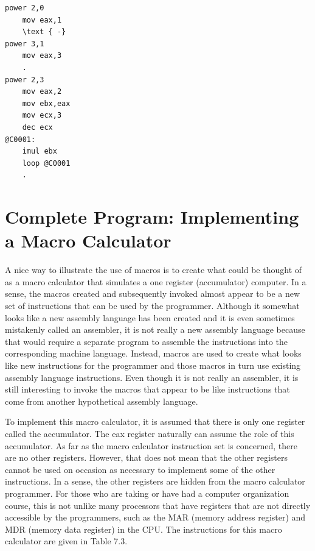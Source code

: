 \documentclass[10pt]{book}
\begin{document}
\begin{verbatim}
power 2,0
    mov eax,1
    \text { -}
power 3,1
    mov eax,3
    .
power 2,3
    mov eax,2
    mov ebx,eax
    mov ecx,3
    dec ecx
@C0001:
    imul ebx
    loop @C0001
    .
\end{verbatim}

\section{Complete Program: Implementing a Macro Calculator}
A nice way to illustrate the use of macros is to create what could be thought of as a macro calculator that simulates a one register (accumulator) computer. In a sense, the macros created and subsequently invoked almost appear to be a new set of instructions that can be used by the programmer. Although it somewhat looks like a new assembly language has been created and it is even sometimes mistakenly called an assembler, it is not really a new assembly language because that would require a separate program to assemble the instructions into the corresponding machine language. Instead, macros are used to create what looks like new instructions for the programmer and those macros in turn use existing assembly language instructions. Even though it is not really an assembler, it is still interesting to invoke the macros that appear to be like instructions that come from another hypothetical assembly language.

To implement this macro calculator, it is assumed that there is only one register called the accumulator. The eax register naturally can assume the role of this accumulator. As far as the macro calculator instruction set is concerned, there are no other registers. However, that does not mean that the other registers cannot be used on occasion as necessary to implement some of the other instructions. In a sense, the other registers are hidden from the macro calculator programmer. For those who are taking or have had a computer organization course, this is not unlike many processors that have registers that are not directly accessible by the programmers, such as the MAR (memory address register) and MDR (memory data register) in the CPU. The instructions for this macro calculator are given in Table 7.3.
\end{document}
